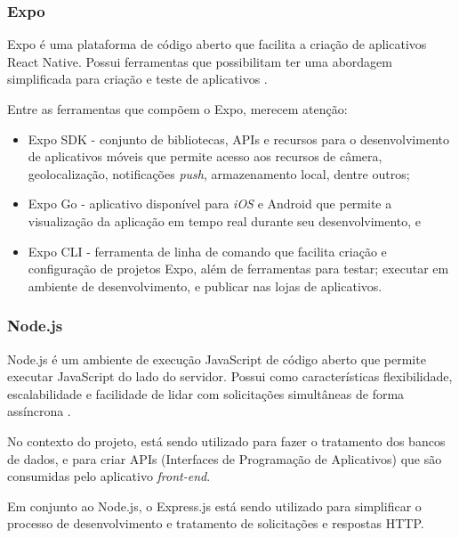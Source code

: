 \subsubsection{Expo}
\label{sec:Expo}
Expo é uma plataforma de código aberto que facilita a criação de aplicativos React Native. Possui ferramentas que  
possibilitam ter uma abordagem simplificada para criação e teste de aplicativos \cite{expo}.

\begin{description}
    \item Entre as ferramentas que compõem o Expo, merecem atenção:
          \begin{itemize}
              \item Expo SDK - conjunto de bibliotecas, APIs e recursos para o desenvolvimento de aplicativos móveis que permite acesso aos 
              recursos de câmera, geolocalização, notificações \textit{push}, armazenamento local, dentre outros;

              \item Expo Go - aplicativo disponível para \textit{iOS} e Android que permite a visualização da aplicação em tempo real durante seu 
              desenvolvimento, e

              \item Expo CLI - ferramenta de linha de comando que facilita criação e configuração de projetos Expo, além de ferramentas para 
              testar; executar em ambiente de desenvolvimento, e publicar nas lojas de aplicativos.
          \end{itemize}
\end{description}

\subsubsection{Node.js}
\label{sec:Node.js}
Node.js é um ambiente de execução JavaScript de código aberto que permite executar JavaScript do lado do servidor. Possui como características 
flexibilidade, escalabilidade e facilidade de lidar com solicitações simultâneas de forma assíncrona \cite{nodejs}.

No contexto do projeto, está sendo utilizado para fazer o tratamento dos bancos de dados, e para criar 
APIs (Interfaces de Programação de Aplicativos) que são consumidas pelo aplicativo \textit{front-end}.

Em conjunto ao Node.js, o Express.js está sendo utilizado para simplificar o processo de desenvolvimento e tratamento de solicitações e respostas HTTP.


